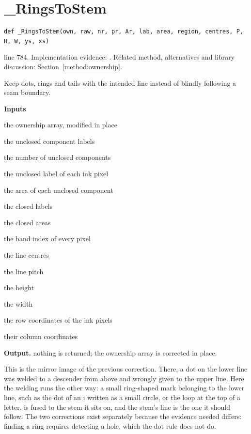 \section{\_RingsToStem}\label{fn:segment:-RingsToStem}
\begin{lstlisting}[style=sig]
def _RingsToStem(own, raw, nr, pr, Ar, lab, area, region, centres, P, H, W, ys, xs)
\end{lstlisting}
 line 784. Implementation evidence: \cite{code2026}. Related method, alternatives and library discussion: Section~\ref{method:ownership}.


Keep dots, rings and tails with the intended line instead of blindly following a seam boundary.




\noindent\textbf{Inputs}
\begin{description}[leftmargin=2.2em,style=nextline,font=\normalfont\ttfamily]\setlength\itemsep{1pt}
  \item[{own}] \normalfont the ownership array, modified in place
  \item[{raw}] \normalfont the unclosed component labels
  \item[{nr}] \normalfont the number of unclosed components
  \item[{pr}] \normalfont the unclosed label of each ink pixel
  \item[{Ar}] \normalfont the area of each unclosed component
  \item[{lab}] \normalfont the closed labels
  \item[{area}] \normalfont the closed areas
  \item[{region}] \normalfont the band index of every pixel
  \item[{centres}] \normalfont the line centres
  \item[{P}] \normalfont the line pitch
  \item[{H}] \normalfont the height
  \item[{W}] \normalfont the width
  \item[{ys}] \normalfont the row coordinates of the ink pixels
  \item[{xs}] \normalfont their column coordinates
\end{description}

\noindent\textbf{Output.} nothing is returned; the ownership array is corrected in place.


This is the mirror image of the previous correction. There, a dot on the lower line was welded to a descender from above and wrongly given to the upper line. Here the welding runs the other way: a small ring-shaped mark belonging to the lower line, such as the dot of an i written as a small circle, or the loop at the top of a letter, is fused to the stem it sits on, and the stem's line is the one it should follow. The two corrections exist separately because the evidence needed differs: finding a ring requires detecting a hole, which the dot rule does not do.


